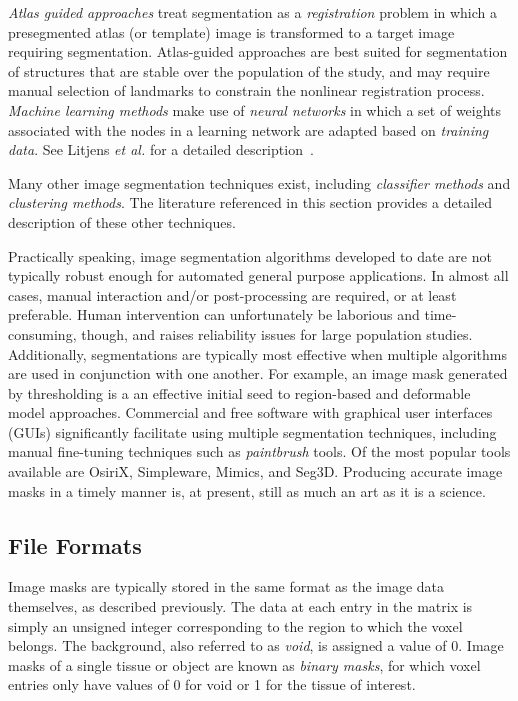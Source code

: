 \textit{Atlas guided approaches} treat segmentation as a \textit{registration} problem in which a presegmented atlas (or template) image is transformed to a target image requiring segmentation. Atlas-guided approaches are best suited for segmentation of structures that are stable over the population of the study, and may require manual selection of landmarks to constrain the nonlinear registration process. \textit{Machine learning methods} make use of \textit{neural networks} in which a set of weights associated with the nodes in a learning network are adapted based on \textit{training data}. See Litjens \textit{et al.} for a detailed description~\cite{litjens_2017}.

Many other image segmentation techniques exist, including \textit{classifier methods} and \textit{clustering methods}. The literature referenced in this section provides a detailed description of these other techniques.

Practically speaking, image segmentation algorithms developed to date are not typically robust enough for automated general purpose applications. In almost all cases, manual interaction and/or post-processing are required, or at least preferable. Human intervention can unfortunately be laborious and time-consuming, though, and raises reliability issues for large population studies. Additionally, segmentations are typically most effective when multiple algorithms are used in conjunction with one another. For example, an image mask generated by thresholding is a an effective initial seed to region-based and deformable model approaches. Commercial and free software with graphical user interfaces (GUIs) significantly facilitate using multiple segmentation techniques, including manual fine-tuning techniques such as \textit{paintbrush} tools. Of the most popular tools available are OsiriX, Simpleware, Mimics, and Seg3D. Producing accurate image masks in a timely manner is, at present, still as much an art as it is a science.

\subsection{File Formats}
\label{Data Format-SEG}

Image masks are typically stored in the same format as the image data themselves, as described previously. The data at each entry in the matrix is simply an unsigned integer corresponding to the region to which the voxel belongs. The background, also referred to as \textit{void}, is assigned a value of 0. Image masks of a single tissue or object are known as \textit{binary masks}, for which voxel entries only have values of 0 for void or 1 for the tissue of interest.
